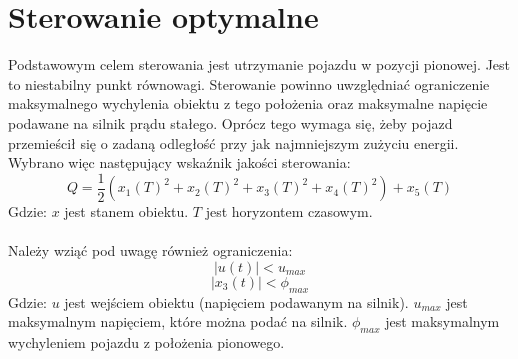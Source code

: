 \section{Sterowanie optymalne}
\label{sec:sterowanie_optymalne}

Podstawowym celem sterowania jest utrzymanie pojazdu w pozycji pionowej. Jest to niestabilny punkt równowagi. Sterowanie powinno uwzględniać ograniczenie maksymalnego wychylenia obiektu z tego położenia oraz maksymalne napięcie podawane na silnik prądu stałego. Oprócz tego wymaga się, żeby pojazd przemieścił się o zadaną odległość przy jak najmniejszym zużyciu energii. Wybrano więc następujący wskaźnik jakości sterowania:
\begin{equation}
Q=\frac{1}{2}(x_1(T)^2+x_2(T)^2+x_3(T)^2+x_4(T)^2)+x_5(T)
\end{equation}
\noindent Gdzie:\newline
\(x\) jest stanem obiektu.\newline
\(T\) jest horyzontem czasowym.

\paragraph*{}
Należy wziąć pod uwagę również ograniczenia:
\begin{equation}
|u(t)|< u_{max}
\label{eq:u_max}
\end{equation}
\begin{equation}
|x_3(t)|< \phi_{max}
\label{eq:phi_max}
\end{equation}
\noindent Gdzie:\newline
\(u\) jest wejściem obiektu (napięciem podawanym na silnik).\newline
\(u_{max}\) jest maksymalnym napięciem, które można podać na silnik.\newline
\(\phi_{max}\) jest maksymalnym wychyleniem pojazdu z położenia pionowego.

